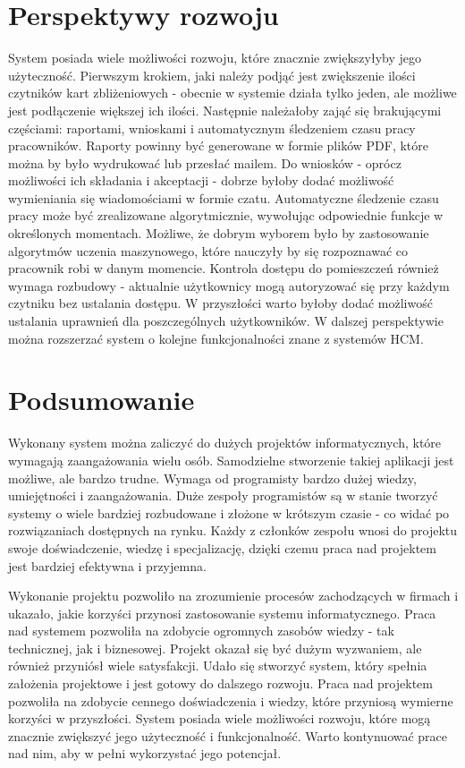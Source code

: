 \section{Perspektywy rozwoju}

System posiada wiele możliwości rozwoju, które znacznie zwiększyłyby jego użyteczność. Pierwszym krokiem, jaki należy podjąć jest zwiększenie ilości czytników kart zbliżeniowych - obecnie w systemie działa tylko jeden, ale możliwe jest podłączenie większej ich ilości. Następnie należałoby zająć się brakującymi częściami: raportami, wnioskami i automatycznym śledzeniem czasu pracy pracowników. Raporty powinny być generowane w formie plików PDF, które można by było wydrukować lub przesłać mailem. Do wniosków - oprócz możliwości ich składania i akceptacji - dobrze byłoby dodać możliwość wymieniania się wiadomościami w formie czatu. Automatyczne śledzenie czasu pracy może być zrealizowane algorytmicznie, wywołując odpowiednie funkcje w określonych momentach. Możliwe, że dobrym wyborem było by zastosowanie algorytmów uczenia maszynowego, które nauczyły by się rozpoznawać co pracownik robi w danym momencie. Kontrola dostępu do pomieszczeń również wymaga rozbudowy - aktualnie użytkownicy mogą autoryzować się przy każdym czytniku bez ustalania dostępu. W przyszłości warto byłoby dodać możliwość ustalania uprawnień dla poszczególnych użytkowników. W dalszej perspektywie można rozszerzać system o kolejne funkcjonalności znane z systemów HCM.

\section{Podsumowanie}

Wykonany system można zaliczyć do dużych projektów informatycznych, które wymagają zaangażowania wielu osób. Samodzielne stworzenie takiej aplikacji jest możliwe, ale bardzo trudne. Wymaga od programisty bardzo dużej wiedzy, umiejętności i zaangażowania. Duże zespoły programistów są w stanie tworzyć systemy o wiele bardziej rozbudowane i złożone w krótszym czasie - co widać po rozwiązaniach dostępnych na rynku. Każdy z członków zespołu wnosi do projektu swoje doświadczenie, wiedzę i specjalizację, dzięki czemu praca nad projektem jest bardziej efektywna i przyjemna.

Wykonanie projektu pozwoliło na zrozumienie procesów zachodzących w firmach i ukazało, jakie korzyści przynosi zastosowanie systemu informatycznego. Praca nad systemem pozwoliła na zdobycie ogromnych zasobów wiedzy - tak technicznej, jak i biznesowej. Projekt okazał się być dużym wyzwaniem, ale również przyniósł wiele satysfakcji. Udało się stworzyć system, który spełnia założenia projektowe i jest gotowy do dalszego rozwoju. Praca nad projektem pozwoliła na zdobycie cennego doświadczenia i wiedzy, które przyniosą wymierne korzyści w przyszłości. System posiada wiele możliwości rozwoju, które mogą znacznie zwiększyć jego użyteczność i funkcjonalność. Warto kontynuować prace nad nim, aby w pełni wykorzystać jego potencjał.